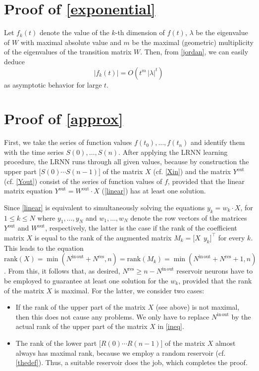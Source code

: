 \documentclass[a4paper,10pt,headings=small]{scrartcl}
\theoremstyle{definition}
\begin{document}
\section{Proof of \cref{exponential}}\label{proof:exponential}

Let $f_k(t)$ denote the value of the $k$-th dimension of $f(t)$, $\lambda$ be
the eigenvalue of $W$ with maximal absolute value and $m$ be the maximal (geometric)
multiplicity of the eigenvalues of the transition matrix $W$. Then, from
\cref{jordan}, we can easily deduce \[ |f_k(t)| = O(t^m\,|\lambda|^t) \]
as asymptotic behavior for large $t$.

\section{Proof of \cref{approx}}\label{proof:approx}

First, we take the series of function values $f(t_0),\dots,f(t_n)$ and identify
them with the time series $S(0),\dots,S(n)$. After applying the LRNN learning
procedure, the LRNN runs through all given values, because by construction the
upper part $\big[ S(0) \cdots S(n-1) \big]$ of the matrix $X$ (cf. \cref{Xin})
and the matrix $Y^\mathrm{out}$ (cf. \cref{Yout}) consist of the series of
function values of $f$, provided that the linear
matrix equation $Y^\mathrm{out} = W^\mathrm{out} \cdot X$ (\cref{linear}) has at
least one solution.

Since \cref{linear} is equivalent to simultaneously solving the equations $y_k =
w_k \cdot X$, for $1 \le k \le N$ where $y_1,\dots,y_N$ and $w_1,\dots,w_N$
denote the row vectors of the matrices $Y^\mathrm{out}$ and $W^\mathrm{out}$,
respectively, the latter is the case if the rank of the coefficient matrix $X$
is equal to the rank of the augmented matrix $M_k = \big[ X ~~ y_k \big]^\top$
for every $k$. This leads to the equation $\mathrm{rank}(X) =
\min(N^\mathrm{in\,out}+N^\mathrm{res},n) = \mathrm{rank}(M_k) =
\min(N^\mathrm{in\,out}+N^\mathrm{res}+1,n)$. From this, it follows that, as
desired, $N^\mathrm{res} \ge n-N^\mathrm{in\,out}$ reservoir neurons have to be
employed to guarantee at least one solution for the $w_k$, provided that the
rank of the matrix $X$ is maximal. For the latter, we consider two cases:
\begin{itemize}
  \item If the rank of the upper part of the matrix $X$ (see above) is not
	maximal, then this does not cause any problems. We only have to replace
	$N^\mathrm{in\,out}$ by the actual rank of the upper part of the matrix
	$X$ in \cref{ineq}.
  \item The rank of the lower part $\big[ R(0) \cdots R(n-1) \big]$ of the
	matrix $X$ almost always has maximal rank, because we employ a random
	reservoir (cf. \cref{thedef}). Thus, a suitable reservoir does the job,
	which completes the proof.
\end{itemize}
\end{document}
